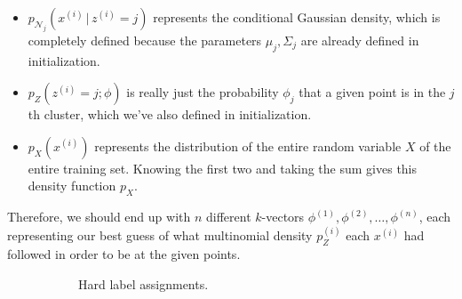 \begin{algo}
\begin{enumerate}
\begin{itemize}
        \item $p_{\mathcal{N}_j}(x^{(i)}\,|\,z^{(i)} = j)$ represents the conditional Gaussian density, which is completely defined because the parameters $\mu_j, \Sigma_j$ are already defined in initialization.
        \item $p_Z(z^{(i)} = j; \phi)$ is really just the probability $\phi_j$ that a given point is in the $j$th cluster, which we've also defined in initialization.
        \item $p_X(x^{(i)})$ represents the distribution of the entire random variable $X$ of the entire training set. Knowing the first two and taking the sum gives this density function $p_X$.
      \end{itemize}
      Therefore, we should end up with $n$ different $k$-vectors $\phi^{(1)}, \phi^{(2)}, \ldots, \phi^{(n)}$, each representing our best guess of what multinomial density $p_Z^{(i)}$ each $x^{(i)}$ had followed in order to be at the given points.

      \begin{figure}[H]
        \centering
        \begin{subfigure}[b]{0.48\textwidth}
          \centering
          \caption{Hard label assignments.}
          \label{fig:hard-guesses}
        \end{subfigure}
        \hfill 
        \begin{subfigure}[b]{0.48\textwidth}
          \centering
\end{subfigure}
\end{figure}
\end{enumerate}
\end{algo}
